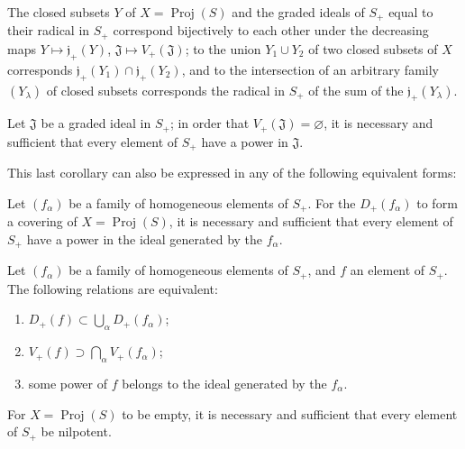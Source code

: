 \begin{corollary}[2.3.12]
\label{II.2.3.12}
The closed subsets $Y$ of $X=\operatorname{Proj}(S)$ and the graded ideals
of $S_+$ equal to their radical in $S_+$ correspond bijectively to each
other under the decreasing maps
$Y\longmapsto\mathfrak{j}_+(Y)$, $\mathfrak{J}\longmapsto
V_+(\mathfrak{J})$; to the union $Y_1\cup Y_2$ of two closed subsets of
$X$ corresponds
$\mathfrak{j}_+(Y_1)\cap\mathfrak{j}_+(Y_2)$, and to the intersection of an
arbitrary family $(Y_\lambda)$ of closed subsets corresponds the radical
in $S_+$ of the sum of the $\mathfrak{j}_+(Y_\lambda)$.
\end{corollary}

\begin{corollary}[2.3.13]
\label{II.2.3.13}
Let $\mathfrak{J}$ be a graded ideal in $S_+$; in order that
$V_+(\mathfrak{J})=\varnothing$, it is necessary and sufficient that every
element of $S_+$ have a power in $\mathfrak{J}$.
\end{corollary}

This last corollary can also be expressed in any of the following
equivalent forms:

\begin{corollary}[2.3.14]
\label{II.2.3.14}
Let $(f_\alpha)$ be a family of homogeneous elements of $S_+$. For the
$D_+(f_\alpha)$ to form a covering of
$X=\operatorname{Proj}(S)$, it is necessary and sufficient that every
element of $S_+$ have a power in the ideal generated by the $f_\alpha$.
\end{corollary}

\begin{corollary}[2.3.15]
\label{II.2.3.15}
Let $(f_\alpha)$ be a family of homogeneous elements of $S_+$, and $f$ an
element of $S_+$. The following relations are equivalent:
\begin{enumerate}
  \item[\rm a)] $D_+(f)\subset\bigcup_\alpha D_+(f_\alpha)$;
  \item[\rm b)] $V_+(f)\supset\bigcap_\alpha V_+(f_\alpha)$;
  \item[\rm c)] some power of $f$ belongs to the ideal generated by the
    $f_\alpha$.
\end{enumerate}
\end{corollary}

\begin{corollary}[2.3.16]
\label{II.2.3.16}
For $X=\operatorname{Proj}(S)$ to be empty, it is necessary and sufficient
that every element of $S_+$ be nilpotent.
\end{corollary}

